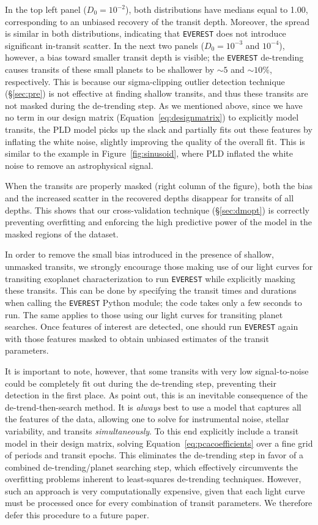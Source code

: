 \documentclass[]{emulateapj}
\begin{document}
In the top left panel ($D_0 = 10^{-2}$), both distributions have medians equal to 1.00, corresponding
to an unbiased recovery of the transit depth. Moreover, the spread is similar in both
distributions, indicating that \texttt{EVEREST} does not introduce significant in-transit
scatter. In the next two panels ($D_0 = 10^{-3}$ and $10^{-4}$), however, a bias toward
smaller transit depth is visible; the \texttt{EVEREST} de-trending causes transits
of these small planets to be shallower by $\sim 5$ and $\sim 10\%$, respectively. This
is because our sigma-clipping outlier detection technique (\S\ref{sec:pre}) is not effective 
at finding shallow transits, and thus these transits are not masked during the de-trending
step. As we mentioned above, since we have no term in our design
matrix (Equation~\ref{eq:designmatrix}) to explicitly model transits, the PLD model
picks up the slack and partially fits out these features by inflating the white noise,
slightly improving the quality of the overall fit. This is similar to the example in 
Figure~\ref{fig:sinusoid}, where PLD inflated the white noise to remove an astrophysical
signal. 

When the transits are properly masked (right column of the figure), both the bias
and the increased scatter in the recovered depths disappear for transits of all
depths. This shows that our cross-validation technique (\S\ref{sec:dmopt}) is
correctly preventing overfitting and enforcing the high predictive power of the model
in the masked regions of the dataset.

In order to remove the small bias introduced in the presence of shallow, unmasked
transits, we strongly encourage those making use of our light curves for transiting exoplanet
characterization to run \texttt{EVEREST} while explicitly masking these transits. 
This can be done by specifying the transit times and durations when calling the \texttt{EVEREST}
Python module; the code takes only a few seconds to run. The same applies to those using our light
curves for transiting planet searches. Once features of interest are detected, one
should run \texttt{EVEREST} again with those features masked to obtain unbiased
estimates of the transit parameters.

It is important to note, however, that some transits with very low signal-to-noise could 
be completely fit out during the de-trending step, preventing their detection in 
the first place. As \cite{DFM15} point out, this is an inevitable
consequence of the de-trend-then-search method. It is \emph{always} best to use
a model that captures all the features of the data, allowing one to solve for 
instrumental noise, stellar variability, and transits \emph{simultaneously}. To this end
\cite{DFM15} explicitly include a transit model in their design matrix, solving
Equation~\ref{eq:pcacoefficients} over a fine grid of periods and transit epochs. This
eliminates the de-trending step in favor of a combined de-trending/planet
searching step, which effectively circumvents the overfitting problems inherent to
least-squares de-trending techniques. However, such an approach is very computationally
expensive, given that each light curve must be processed once for every combination
of transit parameters. We therefore defer this procedure to a future paper.
\end{document}
